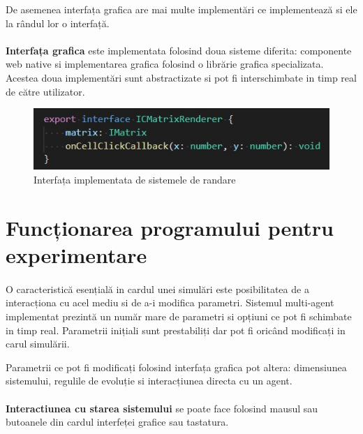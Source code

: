 \documentclass[11pt ,A4]{article}
\begin{document}
                De asemenea interfața grafica are mai multe implementări ce implementează si ele la rândul lor o interfață.



            \paragraph{}
                \textbf{Interfața grafica} este implementata folosind doua sisteme diferita: componente web native si implementarea grafica folosind o librărie grafica specializata.
                Acestea doua implementări sunt abstractizate si pot fi interschimbate  in timp real de către utilizator.
                \begin{figure}[H]
                    \centering
                    \includegraphics[scale=0.8]{ICMatricRenderer_interface}
                    \caption{Interfața implementata de sistemele de randare}
                \end{figure}

    \section{Funcționarea programului pentru experimentare}

        \paragraph{}
            O caracteristică esențială in cardul unei simulări este posibilitatea de a interacționa cu acel mediu si de a-i modifica parametri.
            Sistemul multi-agent implementat prezintă un număr mare de parametri si opțiuni ce pot fi schimbate in timp real.
            Parametrii inițiali sunt prestabiliți dar pot fi oricând modificați in carul simulării.

            Parametrii ce pot fi modificați folosind interfața grafica pot altera: dimensiunea sistemului, regulile de evoluție si interacțiunea directa cu un agent.
        
        \paragraph{}
            \textbf{Interactiunea cu starea sistemului} se poate face folosind mausul sau butoanele din cardul interfeței grafice sau tastatura.
\end{document}
